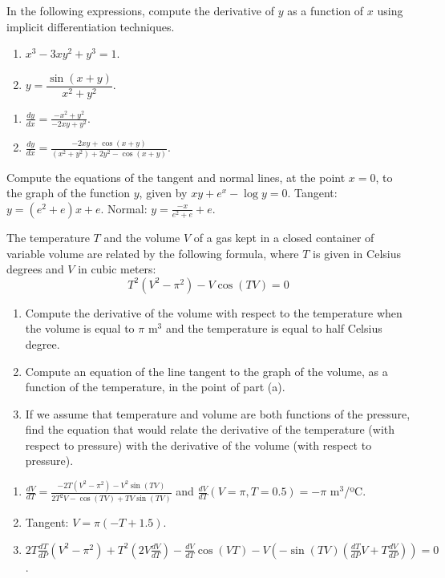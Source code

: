 
{In the following expressions, compute the derivative of $y$ as a function of $x$ using implicit differentiation techniques.
\begin{multicols}{2}
\begin{enumerate}
\item $x^3-3xy^2+y^3=1$.
\item $y=\dfrac{\sin(x+y)}{x^2+y^2}$.
\end{enumerate}
\end{multicols}
}
{\begin{enumerate}
\item $\frac{dy}{dx}=\frac{-x^2+y^2}{-2xy+y^2}.$
\item $\frac{dy}{dx}=\frac{-2xy+\cos(x+y)}{(x^2+y^2)+2y^2-\cos(x+y)}.$
\end{enumerate}
}
{
}


{Compute the equations of the tangent and normal lines, at the point $x=0$, to the graph of the function $y$, given by $xy+e^x-\log y=0$.
}
{Tangent: $y=(e^2+e)x+e$. Normal: $y=\frac{-x}{e^2+e}+e$.
}
{
}


{The temperature $T$ and the volume $V$ of a gas kept in a closed container of variable volume are related by the following formula,
where $T$ is given in Celsius degrees and $V$ in cubic meters:
\[
T^2(V^2-\pi^2)-V\cos(TV)=0
\]
\begin{enumerate}
\item Compute the derivative of the volume with respect to the temperature when the volume is equal to $\pi$ m$^3$ and the temperature
is equal to half Celsius degree.
\item Compute an equation of the line tangent to the graph of the volume, as a function of the temperature, in the point of part (a).
\item If we assume that temperature and volume are both functions of the pressure, find the equation that would relate the derivative of the
temperature (with respect to pressure) with the derivative of the volume (with respect to pressure).
\end{enumerate}
}
{\begin{enumerate}
\item $\frac{dV}{dT} = \frac{-2T(V^2-\pi^2)-V^2\sin(TV)}{2T^2V-\cos(TV)+TV\sin(TV)}$ and $\frac{dV}{dT}(V=\pi,T=0.5)= -\pi$ m$^3$/ºC.
\item Tangent: $V=\pi(-T+1.5)$.
\item $2T\frac{dT}{dP}(V^2-\pi^2)+T^2(2V\frac{dV}{dT})-\frac{dV}{dT}\cos(VT)-V(-\sin(TV)(\frac{dT}{dP}V+T\frac{dV}{dP})) =0$.
\end{enumerate}
}
{
}


